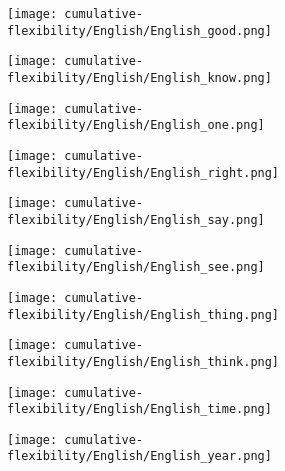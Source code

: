 \begin{figure}

  \caption{Cumulative flexibility of high-frequency lexical items in English}
  \label{fig:cumulative-flexibility-English-items}
  \centering

  \begin{subfigure}{0.5\linewidth}
    \centering
    \caption{}
    \texttt{[image: cumulative-flexibility/English/English\_good.png]}
  \end{subfigure}%
  \begin{subfigure}{0.5\linewidth}
    \centering
    \caption{}
    \texttt{[image: cumulative-flexibility/English/English\_know.png]}
  \end{subfigure}

  \begin{subfigure}{0.5\linewidth}
    \centering
    \caption{}
    \texttt{[image: cumulative-flexibility/English/English\_one.png]}
  \end{subfigure}%
  \begin{subfigure}{0.5\linewidth}
    \centering
    \caption{}
    \texttt{[image: cumulative-flexibility/English/English\_right.png]}
  \end{subfigure}

  \begin{subfigure}{0.5\linewidth}
    \centering
    \caption{}
    \texttt{[image: cumulative-flexibility/English/English\_say.png]}
  \end{subfigure}%
  \begin{subfigure}{0.5\linewidth}
    \centering
    \caption{}
    \texttt{[image: cumulative-flexibility/English/English\_see.png]}
  \end{subfigure}

  \begin{subfigure}{0.5\linewidth}
    \centering
    \caption{}
    \texttt{[image: cumulative-flexibility/English/English\_thing.png]}
  \end{subfigure}%
  \begin{subfigure}{0.5\linewidth}
    \centering
    \caption{}
    \texttt{[image: cumulative-flexibility/English/English\_think.png]}
  \end{subfigure}

  \begin{subfigure}{0.5\linewidth}
    \centering
    \caption{}
    \texttt{[image: cumulative-flexibility/English/English\_time.png]}
  \end{subfigure}%
  \begin{subfigure}{0.5\linewidth}
    \centering
    \caption{}
    \texttt{[image: cumulative-flexibility/English/English\_year.png]}
  \end{subfigure}

\end{figure}

